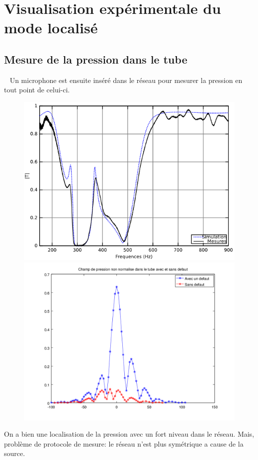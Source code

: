 \documentclass[12pt,notes=show]{beamer} %
\begin{document}
\section{Visualisation expérimentale du mode localisé}


\subsection{Mesure de la pression dans le tube}
\begin{frame}{~}
Un microphone est ensuite inséré dans le réseau pour mesurer la pression en tout point de celui-ci.
\begin{figure}
\centering
\includegraphics[scale=0.23]{bim.png}\hfill
\includegraphics[scale=0.2]{non_norm_lin.png}
\end{figure}

On a bien une localisation de la pression avec un fort niveau dans le réseau.
Mais, problème de protocole de mesure: le réseau n'est plus symétrique a cause de la source.
\end{frame}
\end{document}
